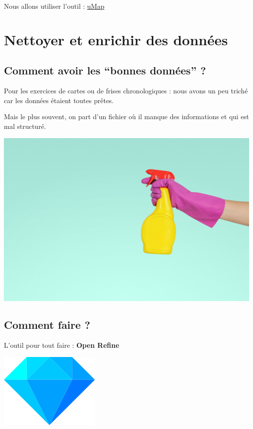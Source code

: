 \documentclass[
  letterpaper,
  DIV=11,
  numbers=noendperiod]{scrartcl}
\begin{document}
Nous allons utiliser l'outil :
\href{https://umap.openstreetmap.fr/fr/}{uMap}

\section{Nettoyer et enrichir des
données}\label{nettoyer-et-enrichir-des-donnuxe9es}

\subsection{Comment avoir les ``bonnes données''
?}\label{comment-avoir-les-bonnes-donnuxe9es}

Pour les exercices de cartes ou de frises chronologiques : nous avons un
peu triché car les données étaient toutes prêtes.

Mais le plus souvent, on part d'un fichier où il manque des informations
et qui est mal structuré.

\begin{center}
\includegraphics{img/jeshoots-com-__ZMnefoI3k-unsplash.jpg}
\end{center}

\subsection{Comment faire ?}\label{comment-faire-3}

L'outil pour tout faire : \textbf{Open Refine}

\includegraphics{img/logooperefine.png}
\end{document}
